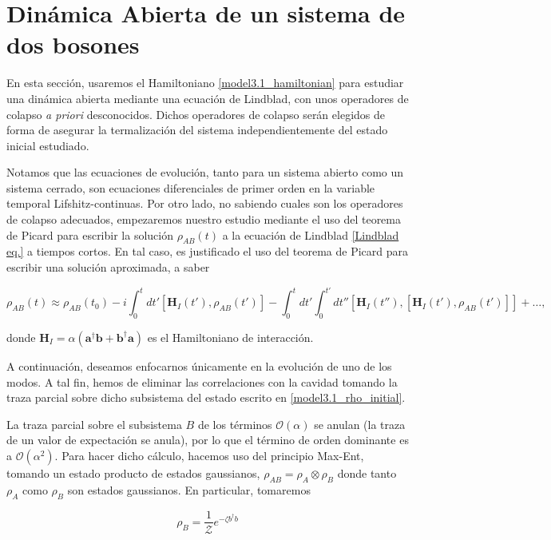\documentclass{report} %
\numberwithin{equation}{section}
\begin{document}
\section{Din\'amica Abierta de un sistema de dos bosones}

En esta sección, usaremos el Hamiltoniano \eqref{model3.1_hamiltonian} para estudiar una dinámica abierta mediante una ecuación de Lindblad, con unos operadores de colapso \textit{a priori} desconocidos. Dichos operadores de colapso serán elegidos de forma de asegurar la termalización del sistema independientemente del estado inicial estudiado. 

Notamos que las ecuaciones de evolución, tanto para un sistema abierto como un sistema cerrado, son ecuaciones diferenciales de primer orden en la variable temporal Lifshitz-continuas. Por otro lado, no sabiendo cuales son los operadores de colapso adecuados, empezaremos nuestro estudio mediante el uso del teorema de Picard \cite{CohenTannoudji1989} para escribir la solución $\rho_{AB}(t)$ a la ecuación de Lindblad \eqref{Lindblad eq.} a tiempos cortos. En tal caso, es justificado el uso del teorema de Picard para escribir una solución aproximada, a saber

\begin{equation}
    \rho_{AB}(t) \approx \rho_{AB}(t_0)-i\int_{0}^{t} dt' [\mathbf{H}_{I}(t'), \rho_{AB}(t')] - \int_{0}^{t} dt' \int_{0}^{t'} dt'' [\mathbf{H}_{I}(t''),[\mathbf{H}_{I}(t'), \rho_{AB}(t')]] + \ldots,
    \label{model3.1_rho_initial}
\end{equation}

donde $\mathbf{H}_I = \alpha({\mathbf a}^{\dagger}{\mathbf b}+ {\mathbf b}^{\dagger}{\mathbf a})$ es el Hamiltoniano de interacción. 

A continuación, deseamos enfocarnos únicamente en { la evolución de uno de los modos}. A tal fin, hemos de {\color{red} } eliminar las correlaciones con la cavidad tomando la traza parcial sobre dicho subsistema del estado escrito en \eqref{model3.1_rho_initial}.

La traza parcial sobre el subsistema $B$ de los términos $\mathcal{O}(\alpha)$ se anulan (la traza de un valor de expectación se anula), por lo que el término de orden dominante es a $\mathcal{O}(\alpha^2)$. Para hacer dicho cálculo, hacemos uso del principio Max-Ent, tomando un estado producto de estados gaussianos, $\rho_{AB} = \rho_{A} \otimes \rho_B$ donde tanto $\rho_A$ como $\rho_B$ son estados gaussianos. En particular, tomaremos

\begin{equation}
\rho_{B} = \frac{1}{\mathcal{Z}} e^{-\zeta b^{\dagger}b }
\label{model1_rhoB}
\end{equation}
\end{document}
